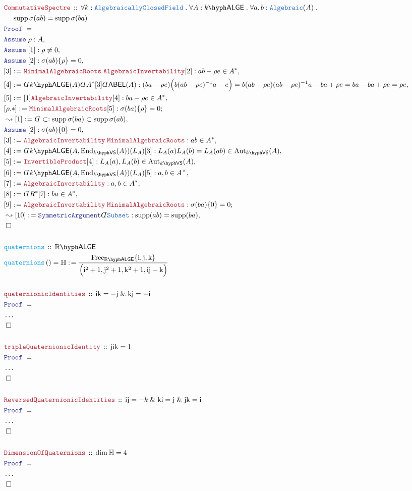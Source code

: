 \documentclass[12pt]{scrartcl}%
\newcommand{\TYPE}[1]{\textcolor{NavyBlue}{\mathtt{#1}}}%
\newcommand{\FUNC}[1]{\textcolor{Cerulean}{\mathtt{#1}}}%
\newcommand{\LOGIC}[1]{\textcolor{Blue}{\mathtt{#1}}}%
\newcommand{\THM}[1]{\textcolor{Maroon}{\mathtt{#1}}}%
\renewcommand{\.}{\; . \;} %
\newcommand{\de}{: \kern 0.1pc =} %
\newcommand{\Act}[1]{\left( #1 \right)} %
\newcommand{\Theorem}[2]{& \THM{#1} \, :: \, #2 \\ & \Proof = \\ } %
\newcommand{\DeclareFunc}[2]{& \FUNC{#1} \, :: \, #2 \\}%
\newcommand{\DefineNamedFunc}[4]{&  \FUNC{#1}\Act{#2} = #3 \de #4 \\}%
\newcommand{\NewLine}{\\ & \kern 1pc}%
\newcommand{\Page}[1]{ \begin{align*} #1 \end{align*}  }%
\newcommand{ \bd }{ \ByDef }%
\newcommand{\NoProof}{ & \ldots \\ \EndProof}%
\renewcommand{\And}{\; \& \;}%
\newcommand{\Reals}{\mathbb{R}}%
\newcommand{\Quat}{\mathbb{H}}%
\DeclareMathOperator*{\supp}{supp}%
\newcommand{\Aut}{\mathrm{Aut}}%
\newcommand{\End}{\mathrm{End}}%
\newcommand{\Say}[3]{& #1 \de #2 : #3, \\} %
\newcommand{\Conclude}[3]{& #1 \de #2 : #3; \\}%
\newcommand{\Derive}[3]{& \leadsto #1 \de #2 : #3, \\} %
\newcommand{\Assume}[2]{& \LOGIC{Assume} \; #1 : #2, \\} %
\newcommand{\QED}{\; \square} %
\newcommand{\EndProof}{& \QED \\} %
\newcommand{\ByDef}{\rotatebox[origin=c]{-180}{$D$}}%
\newcommand{\Proof}{\LOGIC{Proof} \; } %
\newcommand{\ABEL}{\mathsf{ABEL}} %
\newcommand{\VS}[1]{#1\hyph\mathsf{VS}} %
\newcommand{\ACF}{\TYPE{AlgebraicallyClosedField}}
\newcommand{\LALGE}[1]{#1\hyph\mathsf{ALGE}}%
\begin{document}
\Page{
	\Theorem{CommutativeSpectre}{
			\forall k : \ACF \. 
			\forall A : \LALGE{k} \.
			\forall a,b : \TYPE{Algebraic}(A) \. \NewLine  
			\supp \sigma(ab) = \supp \sigma(ba)
	}
	\Assume{\rho}{A}
	\Assume{[1]}{\rho \neq 0}
	\Assume{[2]}{ \sigma(ab)\{\rho\} = 0  }
	\Say{[3]}{\THM{MinimalAlgebraicRoots}\;\THM{AlgebraicInvertability}[2]}{ ab - \rho e \in A^* }
	\Say{[4]}{ \bd \LALGE{k}(A) \bd A^* [3] \bd \ABEL(A)}
	{
		(ba - \rho e) \Big( b(ab - \rho e )^{-1} a   - e \Big) = 
		b (ab - \rho e) (ab  - \rho e)^{-1} a  - ba + \rho e = 
		ba - ba + \rho e = \rho e
	}
	\Say{[5]}{ [1]\THM{AlgebraicInvertability}[4] }{ ba - \rho e \in A^*}
	\Conclude{[\rho.*]}{ \THM{MinimalAlgebraicRoots}[5] }{ \sigma(ba)\{\rho\} = 0}  
	\Derive{[1]}{\bd \subset}{ \supp \sigma(ba) \subset \supp \sigma(ab)  }
	\Assume{[2]}{\sigma(ab)\{0\} = 0 }
	\Say{[3]}{\THM{AlgebraicInvertability}\;\THM{MinimalAlgebraicRoots}}{ab \in A^* }
	\Say{[4]}{\bd \LALGE{k}(A,\End_{\VS{k}}(A))(L_A)[3]}{  L_A(a)L_A(b) = L_A(ab) \in \Aut_{\VS{k}}(A)}
	\Say{[5]}{ \THM{InvertibleProduct} [4] }{ L_A(a),L_A(b) \in \Aut_{\VS{k}}(A)  }
	\Say{[6]}{\bd \LALGE{k}(A,\End_{\VS{k}}(A))(L_A)[5]}{a,b \in A^\times}
	\Say{[7]}{\THM{AlgebraicInvertability}}{a,b \in A^*}
	\Say{[8]}{\bd R^* [7]}{ba \in A^*}
	\Conclude{[9]}{\THM{AlgebraicInvertability}\;\THM{MinimalAlgebraicRoots}}{\sigma(ba)\{0\} = 0 }
	\Derive{[10]}{\LOGIC{SymmetricArgument}\bd \TYPE{Subset}}{\supp (ab) = \supp (ba)}
	\EndProof
	\\
	\DeclareFunc{quaternions}{ \LALGE{\Reals}} 
	\DefineNamedFunc{quaternions}{ }{\mathbb{H}}{\frac{\mathrm{Free}_{\LALGE{\Reals}}\{ \mathrm{i},\mathrm{j},\mathrm{k}\}}{\Big( \mathrm{i}^2 + 1,\mathrm{j}^2 +1, \mathrm{k}^2 + 1, \mathrm{ij} - \mathrm{k} \Big)}}
	\\
	\Theorem{quaternionicIdentities}{ \mathrm{ik} = -\mathrm{j} \And \mathrm{kj} = -\mathrm{i}  }
	\NoProof
	\\
	\Theorem{tripleQuaternionicIdentity}
	{
		\mathrm{jik} = 1
	}
	\NoProof
	\\
	\Theorem{ReversedQuaternionicIdentities}
	{ \mathrm{ij} = -k \And \mathrm{ki} = \mathrm{j} \And \mathrm{jk} = \mathrm{i} }
	\NoProof
	\\
	\Theorem{DimensionOfQuaternions}{\dim \Quat = 4}
	\NoProof
}
\end{document}
